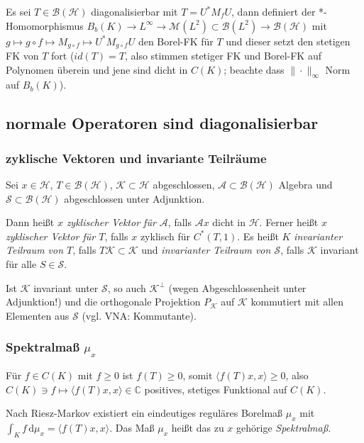 \documentclass[11pt,a4paper]{scrartcl}
\newcommand{\C}{\mathbb{C}} %
\newcommand{\Hc}{\mathcal{H}}
\newcommand{\Sc}{\mathcal{S}}
\newcommand{\Kc}{\mathcal{K}}
\newcommand{\A}{\mathcal{A}}
\newcommand{\B}{\mathcal{B}}
\newcommand{\M}{\mathcal{M}}
\theoremstyle{plain}
\theoremstyle{definition}
\theoremstyle{remark}
\begin{document}
Es sei $T\in \B(\Hc)$ diagonalisierbar mit $T=U^*M_f U$, dann definiert der *-Homomorphismus $B_b(K)\to L^\infty \to \M(L^2) \subset \B(L^2) \to \B(\Hc)$ mit $g\mapsto g\circ f \mapsto M_{g\circ f} \mapsto U^* M_{g\circ f} U$ den Borel-FK für $T$ und dieser setzt den stetigen FK von $T$ fort ($id(T)=T$, also stimmen stetiger FK und Borel-FK auf Polynomen überein und jene sind dicht in $C(K)$; beachte dass $\|\cdot\|_\infty$ Norm auf $B_b(K)$).

\subsection{normale Operatoren sind diagonalisierbar}

\subsubsection{zyklische Vektoren und invariante Teilräume}

Sei $x\in \Hc$, $T\in \B(\Hc)$, $\Kc \subset \Hc$ abgeschlossen, $\A \subset \B(\Hc)$ Algebra und $\Sc \subset \B(\Hc)$ abgeschlossen unter Adjunktion.

Dann heißt $x$ \emph{zyklischer Vektor für $\A$}, falls $\A x$ dicht in $\Hc$. Ferner heißt $x$ \emph{zyklischer Vektor für $T$}, falls $x$ zyklisch für $C^*(T,1)$. Es heißt $K$ \emph{invarianter Teilraum von $T$}, falls $T\Kc \subset \Kc$ und \emph{invarianter Teilraum von $\Sc$}, falls $\Kc$ invariant für alle $S\in \Sc$. 

Ist $\Kc$ invariant unter $\Sc$, so auch $\Kc^\bot$ (wegen Abgeschlossenheit unter Adjunktion!) und die orthogonale Projektion $P_\Kc$ auf $\Kc$ kommutiert mit allen Elementen aus $\Sc$ (vgl. VNA: Kommutante).

\subsubsection{Spektralmaß $\mu_x$}

Für $f\in C(K)$ mit $f \geq 0$ ist $f(T) \geq 0$, somit $\langle f(T)x, x \rangle \geq 0$, also $C(K)\ni f \mapsto \langle f(T)x,x \rangle \in \C$ positives, stetiges Funktional auf $C(K)$.

Nach Riesz-Markov existiert ein eindeutiges reguläres Borelmaß $\mu_x$ mit $\int_K f \,\mathrm{d}\mu_x = \langle f(T)x, x \rangle$. Das Maß $\mu_x$ heißt das zu $x$ gehörige \emph{Spektralmaß}.

\end{document}
